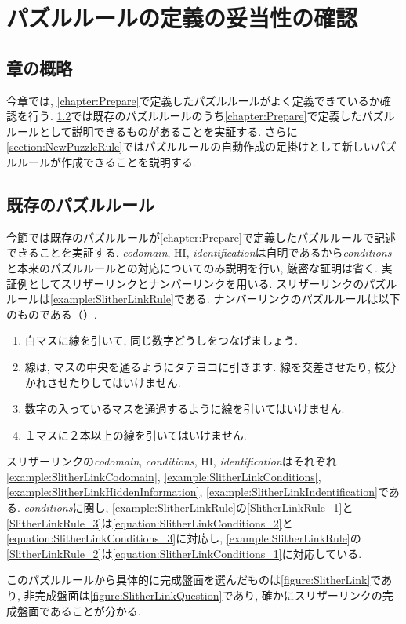 \chapter{パズルルールの定義の妥当性の確認}\label{chapter:3}
\section{章の概略}
今章では, \cref{chapter:Prepare}で定義したパズルルールがよく定義できているか確認を行う. \cref{section:ExistsPuzzleRule}では既存のパズルルールのうち\cref{chapter:Prepare}で定義したパズルルールとして説明できるものがあることを実証する.  さらに\cref{section:NewPuzzleRule}ではパズルルールの自動作成の足掛けとして新しいパズルルールが作成できることを説明する.

\section{既存のパズルルール}\label{section:ExistsPuzzleRule}
今節では既存のパズルルールが\cref{chapter:Prepare}で定義したパズルルールで記述できることを実証する. \textit{codomain}, HI, \textit{identification}は自明であるから\textit{conditions}と本来のパズルルールとの対応についてのみ説明を行い, 厳密な証明は省く.
実証例としてスリザーリンクとナンバーリンクを用いる. スリザーリンクのパズルルールは\cref{example:SlitherLinkRule}である. ナンバーリンクのパズルルールは以下のものである（\cite{web:NumberLink}）.
\begin{example}[ナンバーリンクのパズルルール]\label{example:NumberLinkRule}\textup{}
  \begin{enumerate}
    \item 白マスに線を引いて, 同じ数字どうしをつなげましょう.\label{NumberLinkRule_1}
    \item 線は, マスの中央を通るようにタテヨコに引きます. 線を交差させたり, 枝分かれさせたりしてはいけません.\label{NumberLinkRule_2}
    \item 数字の入っているマスを通過するように線を引いてはいけません.\label{NumberLinkRule_3}
    \item １マスに２本以上の線を引いてはいけません.\label{NumberLinkRule_4}
  \end{enumerate}
\end{example}

\begin{example}[スリザーリンクの数学的記述]
  スリザーリンクの\textit{codomain}, \textit{conditions},  HI, \textit{identification}はそれぞれ\cref{example:SlitherLinkCodomain}, \cref{example:SlitherLinkConditions}, \cref{example:SlitherLinkHiddenInformation}, \cref{example:SlitherLinkIndentification}である. \textit{conditions}に関し, \cref{example:SlitherLinkRule}の\ref{SlitherLinkRule_1}と\ref{SlitherLinkRule_3}は\cref{equation:SlitherLinkConditions_2}と\cref{equation:SlitherLinkConditions_3}に対応し, \cref{example:SlitherLinkRule}の\ref{SlitherLinkRule_2}は\cref{equation:SlitherLinkConditions_1}に対応している.

  このパズルルールから具体的に完成盤面を選んだものは\cref{figure:SlitherLink}であり, 非完成盤面は\cref{figure:SlitherLinkQuestion}であり, 確かにスリザーリンクの完成盤面であることが分かる.
\end{example}

